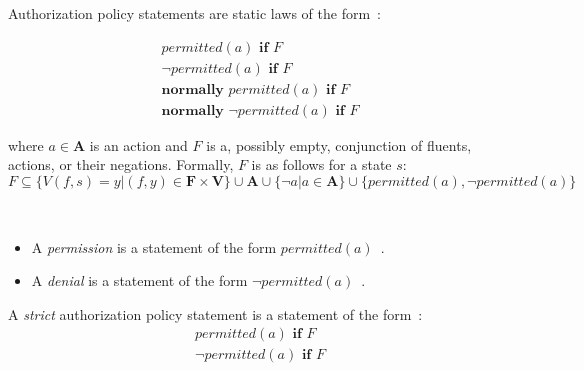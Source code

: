 \begin{definition}
    \label{def:authorization_statements}
    Authorization policy statements are static laws of the form~\citep{gelfond_authorization_2008}:

    \begin{gather}
        permitted\left(a\right) \textbf{ if } F \\
        \neg permitted\left(a\right) \textbf{ if } F \\
        \textbf{normally } permitted(a) \textbf{ if } F \\
        \textbf{normally } \neg permitted(a) \textbf{ if } F
    \end{gather}

    \noindent
    where $a \in \boldsymbol{A}$ is an action and $F$ is a, possibly empty, conjunction of fluents, actions, or their negations.
    Formally, $F$ is as follows for a state $s$:\footnotemark
    \begin{equation}
        F\subseteq\{V(f,s)=y | (f, y) \in \boldsymbol{F} \times \boldsymbol{V}\} \cup \boldsymbol{A} \cup \{\neg a | a \in \boldsymbol{A}\} \cup \{permitted(a), \neg permitted(a)\}
    \end{equation}

\end{definition}

\begin{definition}
    \label{def:permission}
    \label{def:denial}
    ~

    \begin{itemize}
        \item A \textit{permission} is a statement of the form $permitted(a)$~\citep{gelfond_authorization_2008}.
        \item A \textit{denial} is a statement of the form $\neg permitted(a)$~\citep{gelfond_authorization_2008}.
    \end{itemize}
\end{definition}

\begin{definition}
    \label{def:strict_authorization_statements}
    A \textit{strict} authorization policy statement is a statement of the form~\citep{gelfond_authorization_2008}:
    \begin{gather*}
        permitted\left(a\right) \textbf{ if } F \\
        \neg permitted\left(a\right) \textbf{ if } F
    \end{gather*}
\end{definition}

